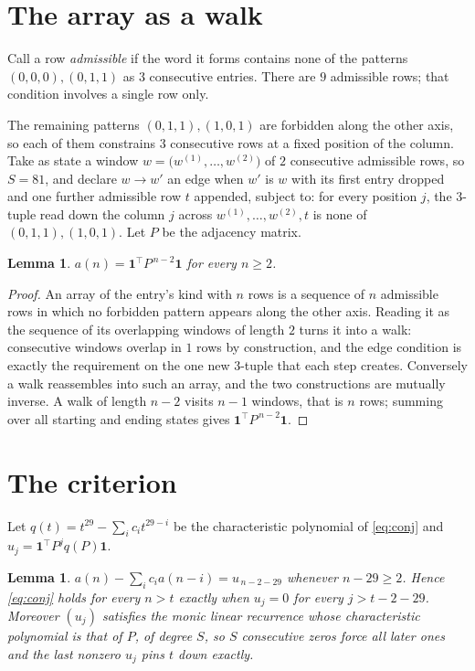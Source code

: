 \documentclass[11pt,a4paper]{article}
\theoremstyle{plain}
\newtheorem{lemma}[theorem]{Lemma}
\theoremstyle{definition}
\begin{document}
\section{The array as a walk}

Call a row \emph{admissible} if the word it forms contains none of the patterns
$(0,0,0), (0,1,1)$ as $3$ consecutive entries. There are $9$ admissible rows; that condition
involves a single row only.

The remaining patterns $(0,1,1), (1,0,1)$ are forbidden along the other axis, so each of them
constrains $3$ consecutive rows at a fixed position of the column. Take as state a
window $w=\bigl(w^{(1)},\dots,w^{(2)}\bigr)$ of $2$ consecutive admissible
rows, so $S=81$, and declare $w\to w'$ an edge when $w'$ is $w$ with its first entry
dropped and one further admissible row $t$ appended, subject to: for every position
$j$, the $3$-tuple read down the column $j$ across $w^{(1)},\dots,w^{(2)},t$
is none of $(0,1,1), (1,0,1)$. Let $P$ be the adjacency matrix.

\begin{lemma}\label{lem:walk}
$a(n)=\mathbf{1}^{\!\top}P^{\,n-2}\mathbf{1}$ for every $n\ge2$.
\end{lemma}

\begin{proof}
An array of the entry's kind with $n$ rows is a sequence of $n$ admissible rows in
which no forbidden pattern appears along the other axis. Reading it as the sequence of its
overlapping windows of length $2$ turns it into a walk: consecutive windows overlap in
$1$ rows by construction, and the edge condition is exactly the requirement on the one
new $3$-tuple that each step creates. Conversely a walk reassembles into such an array,
and the two constructions are mutually inverse. A walk of length $n-2$ visits $n-1$
windows, that is $n$ rows; summing over all starting and ending states gives
$\mathbf{1}^{\!\top}P^{\,n-2}\mathbf{1}$.
\end{proof}

\section{The criterion}

Let $q(t)=t^{29}-\sum_i c_i t^{29-i}$ be the characteristic polynomial of
\eqref{eq:conj} and $u_j=\mathbf{1}^{\!\top}P^{j}q(P)\mathbf{1}$.

\begin{lemma}\label{lem:crit}
$a(n)-\sum_i c_i a(n-i)=u_{\,n-2-29}$ whenever $n-29\ge2$. Hence
\eqref{eq:conj} holds for every $n>t$ exactly when $u_j=0$ for every
$j>t-2-29$. Moreover $(u_j)$ satisfies the monic linear recurrence whose
characteristic polynomial is that of $P$, of degree $S$, so $S$ consecutive zeros force all
later ones and the last nonzero $u_j$ pins $t$ down exactly.
\end{lemma}
\end{document}
